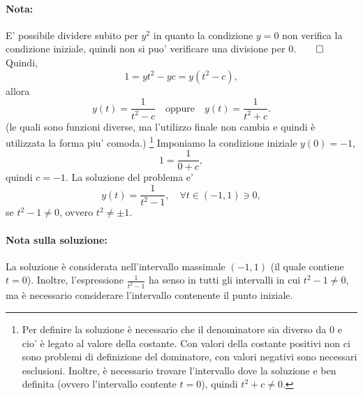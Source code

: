 \begin{example}
    \paragraph{Nota:} E' possibile dividere subito per $y^2$ in quanto la condizione $y=0$ non verifica la condizione iniziale, quindi non si puo' verificare una divisione per 0.$\qed$
    Quindi,
    \begin{equation*}
        1 = y t^2 - yc = y(t^2-c),
    \end{equation*}
    allora
    \begin{equation*}
        y(t) = \frac{1}{t^2-c}\quad\text{oppure}\quad y(t) = \frac{1}{t^2+c}.
    \end{equation*}
    (le quali sono funzioni diverse, ma l'utilizzo finale non cambia e quindi è utilizzata la forma piu' comoda.)
    \footnote{Per definire la soluzione è necessario che il denominatore sia diverso da 0 e cio' è legato al valore della costante. Con valori della costante positivi non ci sono problemi di definizione del dominatore, con valori negativi sono necessari esclusioni. Inoltre, è necessario trovare l'intervallo dove la soluzione e ben definita (ovvero l'intervallo contente $t=0$), quindi $t^2+c\neq 0$.}
    Imponiamo la condizione iniziale $y(0) = -1$,
    \begin{equation*}
        1=\frac{1}{0+c},
    \end{equation*}
    quindi $c=-1$. La soluzione del problema e'
    \begin{equation*}
        y(t) = \frac{1}{t^2 -1},\quad \forall t\in(-1,1)\ni 0,
    \end{equation*}
    se $t^2 -1\neq 0$, ovvero $t^2\neq \pm 1$.
    \paragraph{Nota sulla soluzione:} La soluzione è considerata nell'intervallo massimale $(-1, 1)$ (il quale contiene $t=0$). Inoltre, l'espressione $\frac{1}{t^2 -1}$ ha senso in tutti gli intervalli in cui $t^2-1\neq 0$, ma è necessario considerare l'intervallo contenente il punto iniziale.
\end{example}

